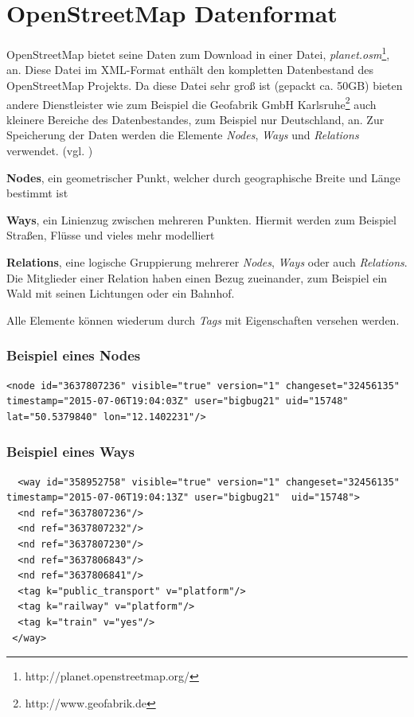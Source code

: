 \section{OpenStreetMap Datenformat}
\label{sec:appendix:osm:data}
OpenStreetMap bietet seine Daten zum Download in einer Datei, \textit{planet.osm}\footnote{http://planet.openstreetmap.org/}, an. Diese Datei im XML-Format enthält den kompletten Datenbestand des OpenStreetMap Projekts. 
Da diese Datei sehr groß ist (gepackt ca. 50GB) bieten andere Dienstleister wie zum Beispiel die Geofabrik GmbH Karlsruhe\footnote{http://www.geofabrik.de} auch kleinere Bereiche des Datenbestandes, zum Beispiel nur Deutschland, an.
Zur Speicherung der Daten werden die Elemente \textit{Nodes}, \textit{Ways} und \textit{Relations} verwendet. (vgl. \cite{WEB:OSM:Primitives:2015})
\begin{compactitem}
  \item \textbf{Nodes}, ein geometrischer Punkt, welcher durch geographische Breite und Länge bestimmt ist
  \item \textbf{Ways}, ein Linienzug zwischen mehreren Punkten. Hiermit werden zum Beispiel Straßen, Flüsse und vieles mehr modelliert
  \item \textbf{Relations}, eine logische Gruppierung mehrerer \textit{Nodes}, \textit{Ways} oder auch \textit{Relations}. Die Mitglieder einer Relation haben einen Bezug zueinander, zum Beispiel ein Wald mit seinen Lichtungen oder ein Bahnhof. 
\end{compactitem}
Alle Elemente können wiederum durch \textit{Tags} mit Eigenschaften versehen werden.

\subsubsection{Beispiel eines Nodes}
\begin{lstlisting}
<node id="3637807236" visible="true" version="1" changeset="32456135" timestamp="2015-07-06T19:04:03Z" user="bigbug21" uid="15748" lat="50.5379840" lon="12.1402231"/>
\end{lstlisting}

\subsubsection{Beispiel eines Ways}
\begin{lstlisting}
  <way id="358952758" visible="true" version="1" changeset="32456135" timestamp="2015-07-06T19:04:13Z" user="bigbug21"  uid="15748">
  <nd ref="3637807236"/>
  <nd ref="3637807232"/>
  <nd ref="3637807230"/>
  <nd ref="3637806843"/>
  <nd ref="3637806841"/>
  <tag k="public_transport" v="platform"/>
  <tag k="railway" v="platform"/>
  <tag k="train" v="yes"/>
 </way>
\end{lstlisting}

